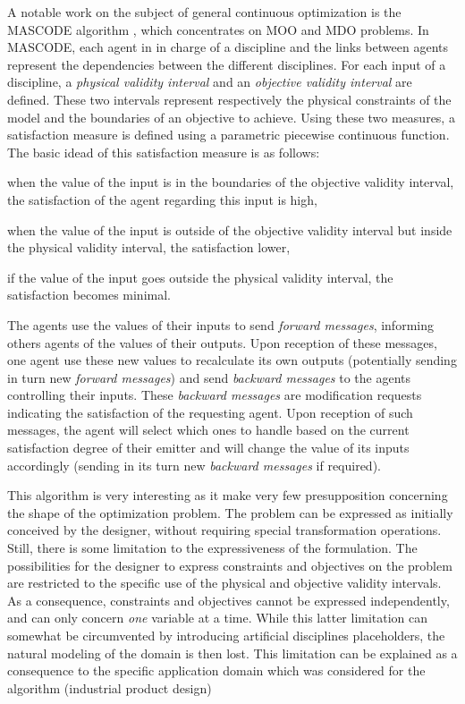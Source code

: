 A notable work on the subject of general continuous optimization is the MASCODE algorithm \cite{welcomme2006self}, which concentrates on MOO and MDO problems. In MASCODE, each agent in in charge of a discipline and the links between agents represent the dependencies between the different disciplines. For each input of a discipline, a \emph{physical validity interval} and an \emph{objective validity interval} are defined. These two intervals represent respectively the physical constraints of the model and the boundaries of an objective to achieve. Using these two measures, a satisfaction measure is defined using a parametric piecewise continuous function. The basic idead of this satisfaction measure is as follows: 
\begin{compactitem}
\item when the value of the input is in the boundaries of the objective validity interval, the satisfaction of the agent regarding this input is high,
\item when the value of the input is outside of the objective validity interval but inside the physical validity interval, the satisfaction lower,
\item if the value of the input goes outside the physical validity interval, the satisfaction becomes minimal.
\end{compactitem}

The agents use the values of their inputs to send \emph{forward messages}, informing others agents of the values of their outputs. Upon reception of these messages, one agent use these new values to recalculate its own outputs (potentially sending in turn new \emph{forward messages}) and send \emph{backward messages} to the agents controlling their inputs. These \emph{backward messages} are modification requests indicating the satisfaction of the requesting agent. Upon reception of such messages, the agent will select which ones to handle based on the current satisfaction degree of their emitter and will change the value of its inputs accordingly (sending in its turn new \emph{backward messages} if required).

This algorithm is very interesting as it make very few presupposition concerning the shape of the optimization problem. The problem can be expressed as initially conceived by the designer, without requiring special transformation operations. Still, there is some limitation to the expressiveness of the formulation. The possibilities for the designer to express constraints and objectives on the problem are restricted to the specific use of the physical and objective validity intervals. As a consequence, constraints and objectives cannot be expressed independently, and can only concern \emph{one} variable at a time. While this latter limitation can somewhat be circumvented by introducing artificial disciplines placeholders, the natural modeling of the domain is then lost. This limitation can be explained as a consequence to the specific application domain which was considered for the algorithm (industrial product design)

